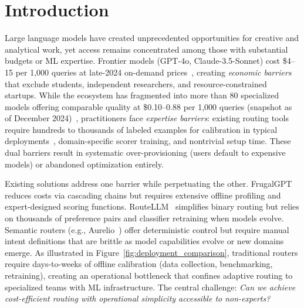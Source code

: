 
\section{Introduction}
\label{sec:introduction}

Large language models have created unprecedented opportunities for creative and analytical work, yet access remains concentrated among those with substantial budgets or ML expertise. Frontier models (GPT-4o, Claude-3.5-Sonnet) cost \$4--15 per 1,000 queries at late-2024 on-demand prices~\cite{openai2025pricing,anthropic2025pricing}, creating \emph{economic barriers} that exclude students, independent researchers, and resource-constrained startups. While the ecosystem has fragmented into more than 80 specialized models offering comparable quality at \$0.10--0.88 per 1,000 queries (snapshot as of December 2024)~\cite{openrouter2025models,artificialanalysis2025}, practitioners face \emph{expertise barriers}: existing routing tools require hundreds to thousands of labeled examples for calibration in typical deployments~\cite{chen2023frugalgpt}, domain-specific scorer training, and nontrivial setup time. These dual barriers result in systematic over-provisioning (users default to expensive models) or abandoned optimization entirely.

Existing solutions address one barrier while perpetuating the other. FrugalGPT~\cite{chen2023frugalgpt} reduces costs via cascading chains but requires extensive offline profiling and expert-designed scoring functions. RouteLLM~\cite{ong2024routellm} simplifies binary routing but relies on thousands of preference pairs and classifier retraining when models evolve. Semantic routers (e.g., Aurelio~\cite{aureliolabs2024semantic}) offer deterministic control but require manual intent definitions that are brittle as model capabilities evolve or new domains emerge. As illustrated in Figure~\ref{fig:deployment_comparison}, traditional routers require days-to-weeks of offline calibration (data collection, benchmarking, retraining), creating an operational bottleneck that confines adaptive routing to specialized teams with ML infrastructure. The central challenge: \textit{Can we achieve cost-efficient routing with operational simplicity accessible to non-experts?}

